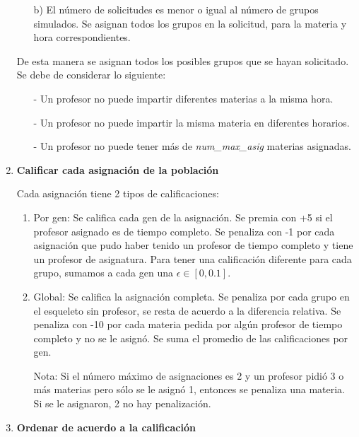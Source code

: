 \begin{enumerate}
\begin{enumerate}
\item[b)] El número de solicitudes es menor o igual al número de grupos simulados. Se asignan todos los grupos en la solicitud, para la materia y hora correspondientes.
\end{enumerate}

De esta manera se asignan todos los posibles grupos que se hayan solicitado. Se debe de considerar lo siguiente:

\begin{itemize}
\item[-] Un profesor no puede impartir diferentes materias a la misma hora.

\item[-] Un profesor no puede impartir la misma materia en diferentes horarios.

\item[-] Un profesor no puede tener más de \textit{num\_max\_asig} materias asignadas.
\end{itemize}

\item \textbf{Calificar cada asignación de la población} \label{paso_califica_asig}

Cada asignación tiene 2 tipos de calificaciones:

\begin{enumerate}
\item Por gen: Se califica cada gen de la asignación. Se premia con +5 si el profesor asignado es de tiempo completo. Se penaliza con -1 por cada asignación que pudo haber tenido un profesor de tiempo completo y tiene un profesor de asignatura. Para tener una calificación diferente para cada grupo, sumamos a cada gen una $\epsilon \in [0,0.1]$.

\item Global: Se califica la asignación completa. Se penaliza por cada grupo en el esqueleto sin profesor, se resta de acuerdo a la diferencia relativa. Se penaliza con -10 por cada materia pedida por algún profesor de tiempo completo y no se le asignó. Se suma el promedio de las calificaciones por gen.

Nota:
Si el número máximo de asignaciones es 2 y un profesor pidió 3 o más  materias pero sólo se le asignó 1, entonces se penaliza una materia. Si se le asignaron, 2 no hay penalización.
\end{enumerate}

\item \textbf{Ordenar de acuerdo a la calificación}


\end{enumerate}
